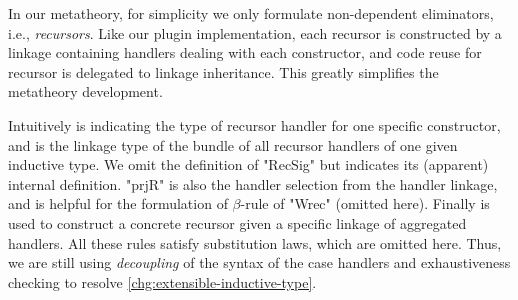 In our metatheory, for simplicity we only formulate non-dependent eliminators, i.e.,
\textit{recursors}.  
Like our plugin implementation, each recursor is constructed by a
linkage containing handlers dealing with each constructor, and code
reuse for recursor is delegated to linkage inheritance.
This greatly simplifies the metatheory development.

Intuitively  is indicating the type of recursor handler
for one specific constructor, and  is the linkage type
of the bundle of all recursor handlers of one given inductive type. We
omit the definition of "RecSig" but  indicates its
(apparent) internal definition. "prjR" is also the handler selection
from the handler linkage, and is helpful for the formulation of
$\beta$-rule of "Wrec" (omitted here). Finally  is
used to construct a concrete recursor given a specific linkage of aggregated
handlers. All these rules satisfy substitution laws, which are omitted here.
Thus, we are still using \textit{decoupling} of the syntax of the case
handlers and exhaustiveness checking to resolve
\ref{chg:extensible-inductive-type}. 

